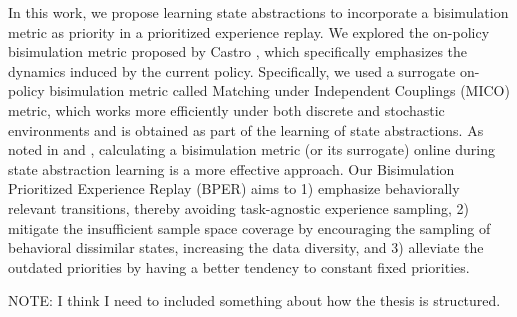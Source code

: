 In this work, we propose learning state abstractions to incorporate a bisimulation metric as priority in a prioritized experience replay. We explored the on-policy bisimulation metric proposed by Castro \cite{castro2020scalable}, which specifically emphasizes the dynamics induced by the current policy. Specifically, we used a surrogate on-policy bisimulation metric called Matching under Independent Couplings (MICO) \cite{castro2021mico} metric, which works more efficiently under both discrete and stochastic environments and is obtained as part of the learning of state abstractions. As noted in \cite{zhang2020learning} and \cite{castro2021mico}, calculating a bisimulation metric (or its surrogate) online during state abstraction learning is a more effective approach. Our Bisimulation Prioritized Experience Replay (BPER) aims to 1) emphasize behaviorally relevant transitions, thereby avoiding task-agnostic experience sampling, 2) mitigate the insufficient sample space coverage by encouraging the sampling of behavioral dissimilar states, increasing the data diversity, and 3) alleviate the outdated priorities by having a better tendency to constant fixed priorities.

NOTE: I think I need to included something about how the thesis is structured.


